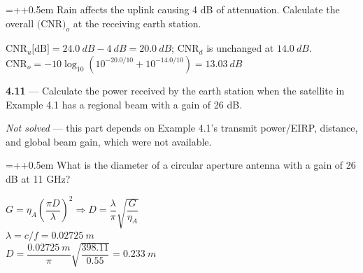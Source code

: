 \documentclass[12pt]{article}
\newcommand{\ans}[1]{\boxed{#1}}
\newlength{\subproblemindent}
\newlength{\subproblemlabelwidth}
\newlength{\solutionindent}
\newcommand{\problem}[2]{\vspace{1em}\noindent\textbf{#1} --- #2\par\vspace{0.25em}}
\newcommand{\subproblem}[2]{%
  \par\vspace{0.5em}%
  \noindent
  \hangindent=\dimexpr\subproblemindent+\subproblemlabelwidth+0.5em\relax
  \hangafter=1
  \hspace*{\subproblemindent}%
  \makebox[\subproblemlabelwidth][l]{\textbf{#1}}#2\par
}
\newcommand{\solution}[1]{%
  \par\vspace{0.0em}%
  \begin{list}{}{
    \setlength{\leftmargin}{\solutionindent}
    \setlength{\rightmargin}{0pt}
    \setlength{\listparindent}{0pt}
    \setlength{\itemindent}{0pt}
    \setlength{\parsep}{0pt}
  }%
    \item\relax
    \begingroup
      \setlength{\baselineskip}{1.5\baselineskip}
      \setlength{\lineskip}{1.5\lineskip}
      \setlength{\parskip}{0pt}
      \everymath{\displaystyle}
      #1
      \par
    \endgroup
  \end{list}%
  \vspace{0.25em}%
}
\begin{document}
\subproblem{b}{Rain affects the uplink causing 4 dB of attenuation. Calculate the overall $\text{(CNR)}_o$ at the receiving earth station.}
\solution{
$\text{CNR}_u\text{[dB]} = 24.0\ dB - 4\ dB = 20.0\ dB$; $\text{CNR}_d$ is unchanged at $14.0\ dB$. \\
$\text{CNR}_o = -10\log_{10}\left(10^{-20.0/10} + 10^{-14.0/10}\right) = \ans{13.03\ dB}$
}
\problem{4.11}{Calculate the power received by the earth station when the satellite in Example 4.1 has a regional beam with a gain of 26 dB.}
\solution{
\textit{Not solved} --- this part depends on Example 4.1's transmit power/EIRP, distance, and global beam gain, which were not available.
}
\subproblem{i}{What is the diameter of a circular aperture antenna with a gain of 26 dB at 11 GHz?}
\solution{
$G = \eta_A\left(\dfrac{\pi D}{\lambda}\right)^2 \Rightarrow D = \dfrac{\lambda}{\pi}\sqrt{\dfrac{G}{\eta_A}}$ \\
$\lambda = c/f = 0.02725\ m$ \\
$D = \dfrac{0.02725\ m}{\pi}\sqrt{\dfrac{398.11}{0.55}} = \ans{0.233\ m}$
}
\end{document}
